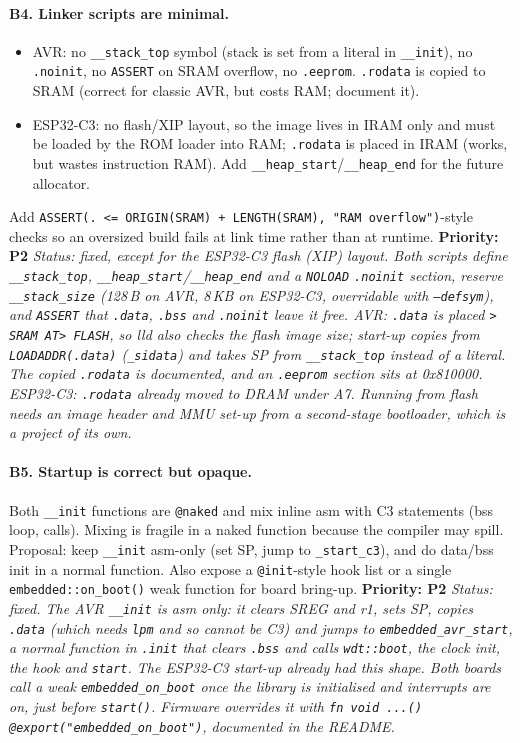 \documentclass[11pt,a4paper]{article}
\newcommand{\pkg}[1]{\texttt{#1}}
\newcommand{\prio}[1]{\textbf{Priority: #1}}
\begin{document}
\paragraph{B4. Linker scripts are minimal.}
\begin{itemize}
  \item AVR: no \pkg{\_\_stack\_top} symbol (stack is set from a literal in \pkg{\_\_init}), no
        \pkg{.noinit}, no \pkg{ASSERT} on SRAM overflow, no \pkg{.eeprom}. \pkg{.rodata} is copied to
        SRAM (correct for classic AVR, but costs RAM; document it).
  \item ESP32-C3: no flash/XIP layout, so the image lives in IRAM only and must be loaded by the
        ROM loader into RAM; \pkg{.rodata} is placed in IRAM (works, but wastes instruction RAM).
        Add \pkg{\_\_heap\_start}/\pkg{\_\_heap\_end} for the future allocator.
\end{itemize}
Add \pkg{ASSERT(. <= ORIGIN(SRAM) + LENGTH(SRAM), "RAM overflow")}-style checks so an oversized
build fails at link time rather than at runtime. \prio{P2}
\textit{Status: fixed, except for the ESP32-C3 flash (XIP) layout. Both scripts define \pkg{\_\_stack\_top}, \pkg{\_\_heap\_start}/\pkg{\_\_heap\_end} and a \pkg{NOLOAD} \pkg{.noinit} section, reserve \pkg{\_\_stack\_size} (128\,B on AVR, 8\,KB on ESP32-C3, overridable with \pkg{--defsym}), and \pkg{ASSERT} that \pkg{.data}, \pkg{.bss} and \pkg{.noinit} leave it free. AVR: \pkg{.data} is placed \pkg{> SRAM AT> FLASH}, so lld also checks the flash image size; start-up copies from \pkg{LOADADDR(.data)} (\pkg{\_sidata}) and takes SP from \pkg{\_\_stack\_top} instead of a literal. The copied \pkg{.rodata} is documented, and an \pkg{.eeprom} section sits at 0x810000. ESP32-C3: \pkg{.rodata} already moved to DRAM under A7. Running from flash needs an image header and MMU set-up from a second-stage bootloader, which is a project of its own.}

\paragraph{B5. Startup is correct but opaque.}
Both \pkg{\_\_init} functions are \pkg{@naked} and mix inline asm with C3 statements (bss loop,
calls). Mixing is fragile in a naked function because the compiler may spill. Proposal: keep
\pkg{\_\_init} asm-only (set SP, jump to \pkg{\_start\_c3}), and do data/bss init in a normal
function. Also expose a \pkg{@init}-style hook list or a single \pkg{embedded::on\_boot()} weak
function for board bring-up. \prio{P2}
\textit{Status: fixed. The AVR \pkg{\_\_init} is asm only: it clears SREG and r1, sets SP, copies \pkg{.data} (which needs \pkg{lpm} and so cannot be C3) and jumps to \pkg{embedded\_avr\_start}, a normal function in \pkg{.init} that clears \pkg{.bss} and calls \pkg{wdt::boot}, the clock init, the hook and \pkg{start}. The ESP32-C3 start-up already had this shape. Both boards call a weak \pkg{embedded\_on\_boot} once the library is initialised and interrupts are on, just before \pkg{start()}. Firmware overrides it with \pkg{fn void ...() @export("embedded\_on\_boot")}, documented in the README.}
\end{document}
